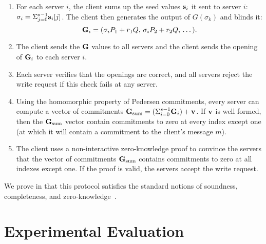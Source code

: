 \documentclass[10pt,twocolumn]{article}
\begin{document}
\begin{enumerate}
  \item For each server $i$, the client sums up the seed values ${\bf s}_i$ it
        sent to server $i$: $\sigma_i = \Sigma_{j=0}^{s-1} {\bf s}_i[j]$.
        The client then generates the output of $G(\sigma_k)$ and blinds it: 
        \[{\bf G}_i = ({\sigma_i}P_1 + {r_1}Q,\, {\sigma_i}P_2 + r_2Q,\, \dots).\]
  \item The client sends the ${\bf G}$ values to all servers and the client
        sends the opening of ${\bf G}_i$ to each server $i$.
  \item Each server verifies that the openings are correct, and all servers
        reject the write request if this check fails at any server.
  \item Using the homomorphic property of Pedersen commitments, every server
        can compute a vector of commitments 
        ${\bf G}_\textrm{sum} = (\Sigma_{i=0}^{s-1} {\bf G}_i) + {\bf v}$.
        If ${\bf v}$ is well formed, then the ${\bf G}_\textrm{sum}$ vector
        contain commitments to zero at every index except one (at which it 
        will contain a commitment to the client's message $m$).
  \item \label{item:check-zkp}
        The client uses a non-interactive zero-knowledge proof to convince
        the servers that the vector of commitments
        ${\bf G}_\textrm{sum}$ contains commitments to zero at all indexes 
        except one.
        If the proof is valid, the servers accept the write request.
\end{enumerate}

We prove in 
that this protocol satisfies the
standard notions of soundness, completeness, and
zero-knowledge~\cite{camenisch1998group}.

 \section{Experimental Evaluation}
\label{sec:eval}
\end{document}
